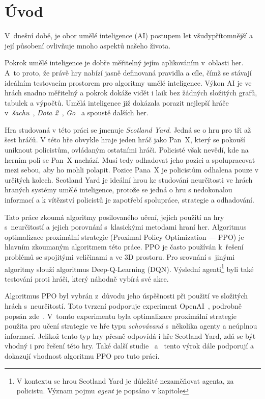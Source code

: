 \newtheorem{definition}{\textbf{Definice}}

\chapter{Úvod}
\label{ch:uvod}

V~dnešní době, je obor umělé inteligence (AI) postupem let všudypřítomnější a její působení ovlivňuje mnoho aspektů našeho života.

Pokrok umělé inteligence je dobře měřitelný jejím aplikováním v~oblasti her.
A~to proto, že právě hry nabízí jasně definovaná pravidla a cíle, čímž se stávají ideálním testovacím prostorem pro algoritmy umělé inteligence.
Výkon AI je ve hrách snadno měřitelný a pokrok dokáže vidět i laik bez žádných složitých grafů, tabulek a výpočtů.
Umělá inteligence již dokázala porazit nejlepší hráče v~\textit{šachu}~\cite{DeepBlue}, \textit{Dota 2}~\cite{Dota2}, \textit{Go}~\cite{AlphaGo} a spoustě dalších her.


Hra studovaná v této práci se jmenuje \emph{Scotland Yard}.
Jedná se o hru pro tři až šest hráčů.
V této hře obvykle hraje jeden hráč jako Pan~X, který se pokouší uniknout policistům, ovládaným ostatními hráči.
Policisté však nevědí, kde na herním poli se Pan~X nachází.
Musí tedy odhadovat jeho pozici a spolupracovat mezi sebou, aby ho mohli polapit.
Pozice Pana~X je policistům odhalena pouze v určitých kolech.
Scotland Yard je ideální hrou ke studování neurčitosti ve hrách hraných systémy umělé inteligence, protože se jedná o hru s nedokonalou informací a k vítězství policistů je zapotřebí spolupráce, strategie a odhadování.

Tato práce zkoumá algoritmy posilovaného učení, jejich použití na hry s~neurčitostí a jejich porovnání s~klasickými metodami hraní her.
Algoritmus optimalizace proximální strategie (Proximal Policy Optimization --- PPO) je hlavním zkoumaným algoritmem této práce.
PPO je často používán k~řešení problémů se spojitými veličinami a ve 3D prostoru.
Pro srovnání s~jinými algoritmy slouží algoritmus Deep-Q-Learning (DQN).
Výslední agenti\footnote[1]{V kontextu se hrou Scotland Yard je důležité nezaměňovat agenta, za policistu.
Význam pojmu \emph{agent} je popsáno v kapitole } byli také testování proti hráči, který náhodně vybírá své akce.

Algoritmus PPO byl vybrán z~důvodu jeho úspěšnosti při použití ve složitých hrách s~neurčitostí.
Toto tvrzení podporuje experiment OpenAI~\cite{PPO_Hide_Seek_page}, podrobně popsán zde~\cite{PPO_Hide_Seek_paper}.
V~tomto experimentu byla optimalizace proximální strategie použita pro učení strategie ve hře typu \textit{schovávaná} s~několika agenty a neúplnou informací.
Jelikož tento typ hry přesně odpovídá i hře Scotland Yard, zdá se být vhodný i pro řešení této hry.
Také další studie~\cite{Manille} a~\cite{Dota2} tento výrok dále podporují a dokazují vhodnost algoritmu PPO pro tuto práci.

